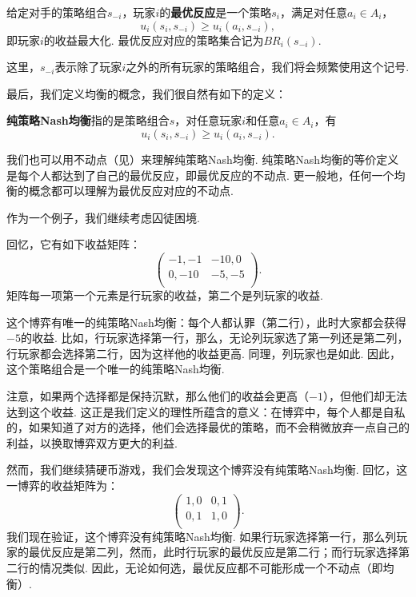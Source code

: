 \begin{definition}[最优反应]
给定对手的策略组合$s_{-i}$，玩家$i$的\textbf{最优反应}是一个策略$s_i$，满足对任意$a_i\in A_i$，
    \[u_i(s_i,s_{-i})\geq u_i(a_i,s_{-i}),\]
即玩家$i$的收益最大化. 最优反应对应的策略集合记为$BR_i(s_{-i})$.
\end{definition}
这里，$s_{-i}$表示除了玩家$i$之外的所有玩家的策略组合，我们将会频繁使用这个记号.

最后，我们定义均衡的概念，我们很自然有如下的定义：

\begin{definition}[纯策略Nash均衡]
\textbf{纯策略Nash均衡}指的是策略组合$s$，对任意玩家$i$和任意$a_i\in A_i$，有
    \[u_i(s_i,s_{-i})\geq u_i(a_i,s_{-i}).\]
\end{definition}

我们也可以用不动点（见）来理解纯策略Nash均衡. 纯策略Nash均衡的等价定义是每个人都达到了自己的最优反应，即最优反应的不动点. 更一般地，任何一个均衡的概念都可以理解为最优反应对应的不动点.

作为一个例子，我们继续考虑囚徒困境.
\begin{example}[囚徒困境的纯策略Nash均衡]
回忆，它有如下收益矩阵：
\[
\begin{pmatrix}
-1,-1&-10,0\\
0,-10&-5,-5\\
\end{pmatrix}.
\]
矩阵每一项第一个元素是行玩家的收益，第二个是列玩家的收益. 

这个博弈有唯一的纯策略Nash均衡：每个人都认罪（第二行），此时大家都会获得$-5$的收益. 比如，行玩家选择第一行，那么，无论列玩家选了第一列还是第二列，行玩家都会选择第二行，因为这样他的收益更高. 同理，列玩家也是如此. 因此，这个策略组合是一个唯一的纯策略Nash均衡.

注意，如果两个选择都是保持沉默，那么他们的收益会更高（$-1$），但他们却无法达到这个收益. 这正是我们定义的理性所蕴含的意义：在博弈中，每个人都是自私的，如果知道了对方的选择，他们会选择最优的策略，而不会稍微放弃一点自己的利益，以换取博弈双方更大的利益.
\end{example}

然而，我们继续猜硬币游戏，我们会发现这个博弈没有纯策略Nash均衡. 回忆，这一博弈的收益矩阵为：
    \[
    \begin{pmatrix}
    1,0&0,1\\
    0,1&1,0\\
    \end{pmatrix}.
    \]
我们现在验证，这个博弈没有纯策略Nash均衡. 如果行玩家选择第一行，那么列玩家的最优反应是第二列，然而，此时行玩家的最优反应是第二行；而行玩家选择第二行的情况类似. 因此，无论如何选，最优反应都不可能形成一个不动点（即均衡）.

